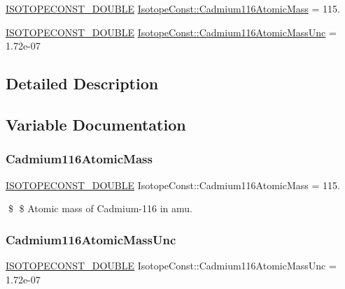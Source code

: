 \begin{DoxyCompactItemize}
\item 
\mbox{\hyperlink{group___isotope_const-_macros_ga8f45a7272ce02c0b4c65c44636ed719a}{I\+S\+O\+T\+O\+P\+E\+C\+O\+N\+S\+T\+\_\+\+D\+O\+U\+B\+LE}} \mbox{\hyperlink{group___isotope_const-_cadmium-_cd116_ga27742e4201f5f29c1c42fbcaa5269293}{Isotope\+Const\+::\+Cadmium116\+Atomic\+Mass}} = 115.
\item 
\mbox{\hyperlink{group___isotope_const-_macros_ga8f45a7272ce02c0b4c65c44636ed719a}{I\+S\+O\+T\+O\+P\+E\+C\+O\+N\+S\+T\+\_\+\+D\+O\+U\+B\+LE}} \mbox{\hyperlink{group___isotope_const-_cadmium-_cd116_gae4754181d588568560ffd84a96beb5a0}{Isotope\+Const\+::\+Cadmium116\+Atomic\+Mass\+Unc}} = 1.\+72e-\/07
\end{DoxyCompactItemize}


\subsection{Detailed Description}


\subsection{Variable Documentation}
\mbox{\label{group___isotope_const-_cadmium-_cd116_ga27742e4201f5f29c1c42fbcaa5269293}} 
\subsubsection{\texorpdfstring{Cadmium116\+Atomic\+Mass}{Cadmium116AtomicMass}}
{\footnotesize\ttfamily \mbox{\hyperlink{group___isotope_const-_macros_ga8f45a7272ce02c0b4c65c44636ed719a}{I\+S\+O\+T\+O\+P\+E\+C\+O\+N\+S\+T\+\_\+\+D\+O\+U\+B\+LE}} Isotope\+Const\+::\+Cadmium116\+Atomic\+Mass = 115.}

\$ \$ Atomic mass of Cadmium-\/116 in amu. \mbox{\label{group___isotope_const-_cadmium-_cd116_gae4754181d588568560ffd84a96beb5a0}} 
\subsubsection{\texorpdfstring{Cadmium116\+Atomic\+Mass\+Unc}{Cadmium116AtomicMassUnc}}
{\footnotesize\ttfamily \mbox{\hyperlink{group___isotope_const-_macros_ga8f45a7272ce02c0b4c65c44636ed719a}{I\+S\+O\+T\+O\+P\+E\+C\+O\+N\+S\+T\+\_\+\+D\+O\+U\+B\+LE}} Isotope\+Const\+::\+Cadmium116\+Atomic\+Mass\+Unc = 1.\+72e-\/07}

